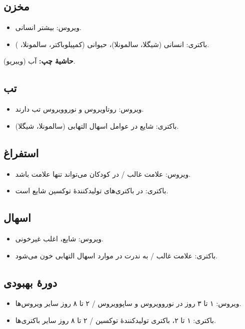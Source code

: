 \documentclass[11pt,a4paper]{article}
\newcommand{\en}[1]{\lr{#1}}
\begin{document}
\subsection*{مخزن}
\begin{itemize}
\item ویروس: بیشتر انسانی.
\item باکتری: انسانی (شیگلا، سالمونلا)، حیوانی (کمپیلوباکتر، سالمونلا، \en{EColi}).
\end{itemize}
\textbf{حاشیهٔ چپ:} آب (ویبریو).

\subsection*{تب}
\begin{itemize}
\item ویروس: روتاویروس و نوروویروس تب دارند.
\item باکتری: شایع در عوامل اسهال التهابی (سالمونلا، شیگلا).
\end{itemize}

\subsection*{استفراغ}
\begin{itemize}
\item ویروس: علامت غالب / در کودکان می‌تواند تنها علامت باشد.
\item باکتری: در باکتری‌های تولیدکنندهٔ توکسین شایع است.
\end{itemize}

\subsection*{اسهال}
\begin{itemize}
\item ویروس: شایع، اغلب غیرخونی.
\item باکتری: علامت غالب / به ندرت در موارد اسهال التهابی خون می‌شود.
\end{itemize}

\subsection*{دورهٔ بهبودی}
\begin{itemize}
\item ویروس: ۱ تا ۳ روز در نوروویروس و ساپوویروس / ۲ تا ۸ روز سایر ویروس‌ها.
\item باکتری: ۱ تا ۲، باکتری تولیدکنندهٔ توکسین / ۲ تا ۸ روز سایر باکتری‌ها.
\end{itemize}
\end{document}
